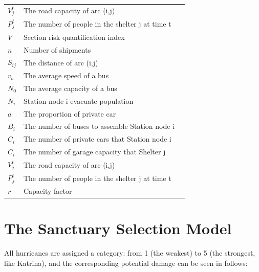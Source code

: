\documentclass{mcmthesis}
\begin{document}
\begin{center}
\begin{longtable}{p{}p{}m{}}
$V_j^t$       & The road capacity of arc (i,j)                                            \\
$P_j^t$       & The number of people in the shelter j at time t                          \\
$V$       & Section risk quantification index                                         \\
$n$       & Number of shipments                                                     \\
$S_{ij}$       & The distance of arc (i,j)                                                \\
$v_b$       & The average speed of a bus                                                \\
$N_0$       & The average capacity of a bus                                             \\
$N_i$       & Station node i evacuate population                                        \\
$a$       & The proportion of private car                                           \\
$B_i$       & The number of buses to assemble Station node i                            \\
$C_i$       & The number of private cars that Station node i                            \\
$C_i$        & The number of garage capacity that Shelter j                             \\
$V_j^t$       & The road capacity of arc (i,j)                                            \\
$P_j^t$       & The number of people in the shelter j at time t                          \\
$r$       & Capacity factor                                                          \\ \hline

 \end{longtable}
 \end{center}


\section{The Sanctuary Selection Model}
All hurricanes are assigned a category: from 1 (the weakest) to 5 (the strongest, like Katrina), and the corresponding potential damage can be seen in  follows:
\end{document}
